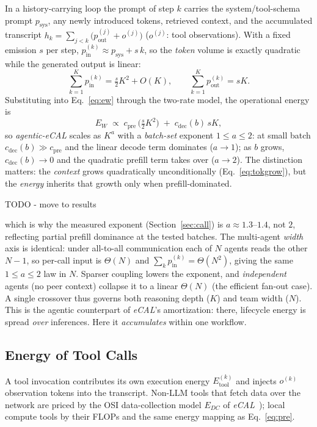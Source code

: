 \documentclass[journal]{IEEEtran}
\newcommand{\agecal}{\textit{agentic-eCAL}}
\newcommand{\ecal}{\textit{eCAL}}
\begin{document}
In a history-carrying loop the prompt of step $k$
carries the system/tool-schema prompt $p_{\mathrm{sys}}$, any newly introduced tokens, retrieved
context, and the accumulated transcript $h_k=\sum_{j<k}\!\big(p_{\mathrm{out}}^{(j)}+o^{(j)}\big)$
($o^{(j)}$: tool observations). With a fixed emission $s$ per step, $p_{\mathrm{in}}^{(k)}\!\approx\!
p_{\mathrm{sys}}+s\,k$, so the \emph{token} volume is exactly quadratic while the generated output is
linear:
\begin{equation}
\sum_{k=1}^{K} p_{\mathrm{in}}^{(k)} = \tfrac{s}{2}K^2 + O(K),
\qquad
\sum_{k=1}^{K} p_{\mathrm{out}}^{(k)} = sK .
\label{eq:tokgrow}
\end{equation}
Substituting into Eq.~\eqref{eq:ew} through the two-rate model, the operational energy is
\begin{equation}
E_W \;\propto\; c_{\mathrm{pre}}\,\big(\tfrac{s}{2}K^2\big) \;+\; c_{\mathrm{dec}}(b)\,sK ,
\label{eq:ewscale}
\end{equation}
so \agecal{} scales as $K^{a}$ with a \emph{batch-set} exponent $1\!\le\!a\!\le\!2$: at small batch
$c_{\mathrm{dec}}(b)\!\gg\!c_{\mathrm{pre}}$ and the linear decode term dominates ($a\!\to\!1$); as $b$
grows, $c_{\mathrm{dec}}(b)\!\to\!0$ and the quadratic prefill term takes over ($a\!\to\!2$). The
distinction matters: the \emph{context} grows quadratically unconditionally
(Eq.~\eqref{eq:tokgrow}), but the \emph{energy} inherits that growth only when prefill-dominated.


TODO - move to results

which is why the measured exponent (Section~\ref{sec:call}) is $a\!\approx\!1.3$--$1.4$, not $2$,
reflecting partial prefill dominance at the tested batches. The multi-agent \emph{width} axis is
identical: under all-to-all communication each of $N$ agents reads the other $N\!-\!1$, so per-call
input is $\Theta(N)$ and $\sum_k p_{\mathrm{in}}^{(k)}=\Theta(N^2)$, giving the same
$1\!\le\!a\!\le\!2$ law in $N$. Sparser coupling lowers the exponent, and \emph{independent} agents
(no peer context) collapse it to a linear $\Theta(N)$ (the efficient fan-out case). A single crossover
thus governs both reasoning depth ($K$) and team width ($N$). This is the agentic counterpart of
\ecal{}'s amortization: there, lifecycle energy is spread \emph{over} inferences. Here it
\emph{accumulates} within one workflow.

\subsection{Energy of Tool Calls} 
A tool invocation contributes its own execution energy $E_{\mathrm{tool}}^{(k)}$
and injects $o^{(k)}$ observation tokens into the transcript. Non-LLM tools that fetch data over the
network are priced by the OSI data-collection model $E_{DC}$ of \ecal{}~\cite{chou2026ecal}); local compute tools by their FLOPs and the same energy mapping as
Eq.~\eqref{eq:pre}.
\end{document}
